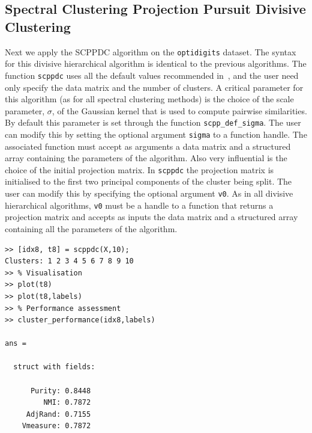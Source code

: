 \documentclass{book}
\begin{document}
\subsection{Spectral Clustering Projection Pursuit Divisive Clustering}

Next we apply the SCPPDC algorithm on the {\tt optidigits} dataset. The syntax
for this divisive hierarchical algorithm is identical to the previous
algorithms. The function {\tt scppdc} uses all the default values recommended
in~\cite{HofmeyrPE2018}, and the user need only specify the data matrix and the
number of clusters. 
%
A critical parameter for this algorithm (as for all
spectral clustering methods) is the choice of the scale parameter, $\sigma$, of
the Gaussian kernel that is used to compute pairwise similarities.
%
By default this parameter is set through the function {\tt scpp\_def\_sigma}.
The user can modify this by setting the optional argument {\tt sigma}
to a function handle. The associated function must accept as
arguments a data matrix and a structured array containing the parameters
of the algorithm.
%
Also very influential is the choice of the initial projection matrix.
In {\tt scppdc} the projection matrix is initialised to the first two principal
components of the cluster being split. 
The user can modify this by specifying the optional
argument {\tt v0}. As in all divisive hierarchical algorithms, {\tt v0} must
be a handle to a
function that returns a projection matrix and accepts as inputs
the data matrix and a structured array containing all the parameters
of the algorithm.


\begin{lstlisting}
>> [idx8, t8] = scppdc(X,10);
Clusters: 1 2 3 4 5 6 7 8 9 10
>> % Visualisation
>> plot(t8)
>> plot(t8,labels)
>> % Performance assessment
>> cluster_performance(idx8,labels)

ans = 

  struct with fields:

      Purity: 0.8448
         NMI: 0.7872
     AdjRand: 0.7155
    Vmeasure: 0.7872

\end{lstlisting}
\end{document}
